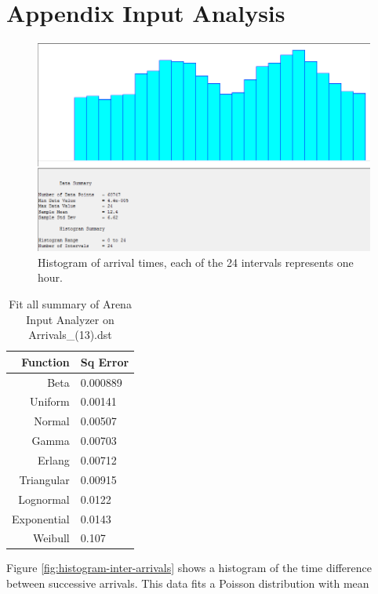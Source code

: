 \section{Appendix Input Analysis}\label{app:inputanalysis}
\begin{figure}[h]
	\includegraphics[width=\textwidth]{images/histogram-arrivals.PNG}
	\caption{Histogram of arrival times, each of the 24 intervals represents one hour.}
	\label{fig:histogram-arrivals}
\end{figure}

\begin{table}[h]
	\centering
	\begin{tabular}{r | l}
		Function  &     Sq Error\\
		\hline
		Beta       &  0.000889\\
		Uniform     & 0.00141\\
		Normal       &0.00507\\
		Gamma        &0.00703\\
		Erlang       &0.00712\\
		Triangular   &0.00915\\
		Lognormal    &0.0122\\
		Exponential  &0.0143\\
		Weibull      &0.107	
	\end{tabular}
	\caption{Fit all summary of Arena Input Analyzer on Arrivals\_(13).dst}
	\label{tab:fitallarrivals}
\end{table}

Figure \ref{fig:histogram-inter-arrivals} shows a histogram of the time difference between successive arrivals. This data fits a Poisson distribution with mean 

